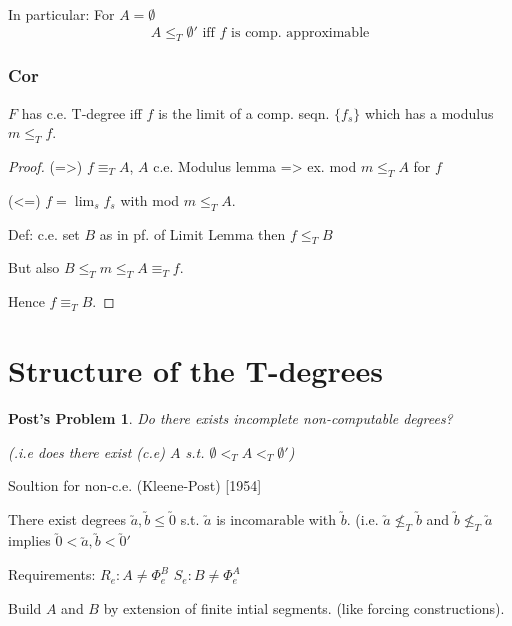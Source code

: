 \documentclass[12pt]{article}
\begin{document}
In particular: For $A = \emptyset$
\[
 A \le_T \emptyset' \text{ iff $f$ is comp. approximable}
\]

\subsubsection*{Cor}
$F$ has c.e. T-degree iff $f$ is the limit of a comp. seqn. 
$\{f_s\}$ which has a modulus $m \le_T f$.

\begin{proof}
 (=>) $f \equiv_T A$, $A$ c.e.
Modulus lemma => ex. mod $m \le_T A$ for $f$ 

(<=) $f = \lim_s f_s$ with mod $m \le_T A$.

Def: c.e. set $B$ as in pf. of Limit Lemma
then $f \le_T B$

But also $B \le_T m \le_T A \equiv_T f$.

Hence $f \equiv_T B$.
\end{proof}

\section*{Structure of the T-degrees}
\newtheorem*{postp}{Post's Problem}
\begin{postp}
 Do there exists incomplete non-computable degrees?

(.i.e does there exist (c.e) $A$ s.t. $\emptyset <_T A <_T \emptyset'$)
\end{postp}

Soultion for non-c.e. (Kleene-Post) [1954]

There exist degrees $\utilde{a}, \utilde{b} \le \utilde{0}$
s.t. $\utilde{a}$ is incomarable with $\utilde{b}$.
(i.e. $\utilde{a} \not\le_T \utilde{b}$ and $\utilde{b} \not\le_T \utilde{a}$
implies $\utilde{0} < \utilde{a},\utilde{b} < \utilde{0}'$

Requirements:
$R_e: A \ne \Phi^B_e$
$S_e: B \ne \Phi^A_e$

Build $A$ and $B$ by extension of finite intial segments.
(like forcing constructions).
\end{document}
